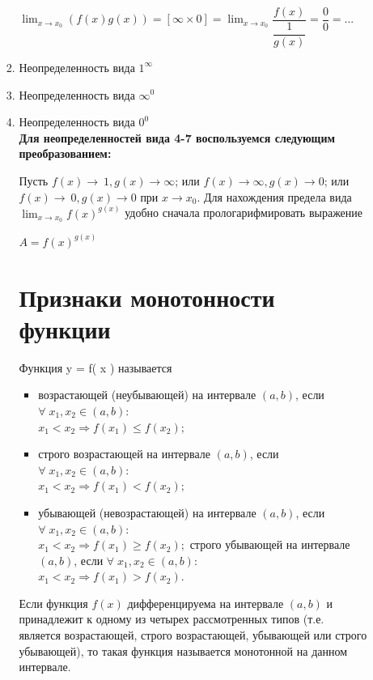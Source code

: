 \documentclass[oneside]{book}
\begin{document}
\begin{enumerate}
\begin{itemize}
\begin{enumerate}
	$\lim_{x \to x_{0}} (f(x)g(x))=
	[\infty\times 0]=
	\lim_{x \to x_{0}} \dfrac{f(x)}{\dfrac{1}{g(x)}}=
	\dfrac{0}{0}=...$

	\item Неопределенность вида $1^{\infty}$
	\item Неопределенность вида $\infty^{0}$
	\item Неопределенность вида $0^{0}$\\

	\textbf{Для неопределенностей вида 4-7 воспользуемся следующим преобразованием:}

	Пусть $f(x)\to\ 1, g(x)\to\infty$; или $f(x)\to\infty, g(x)\to 0$; или $f(x)\to\ 0, g(x)\to 0$ при $x\to x_{0}$. Для нахождения предела вида $\lim_{x\to x_{0}} f(x)^{g(x)}$ удобно сначала прологарифмировать выражение
	 \begin{center}
		$A=f(x)^{g(x)}$
	\end{center}

  \setcounter{chapter}{25}         

\setcounter{chapter}{26}         
\chapter{Признаки монотонности функции\\}         

Функция y = f\left( x \right) называется \\ 
\begin{itemize}
    \item возрастающей (неубывающей) на интервале $\left( {a,b} \right)$, если
    ${\forall\;{x_1},{x_2} \in \left( {a,b} \right):\;}$\\
    ${{x_1} < {x_2} \Rightarrow f\left( {{x_1}} \right) \leq f\left( {{x_2}} \right);}$
    \item строго возрастающей на интервале $\left( {a,b} \right)$, если
    ${\forall\;{x_1},{x_2} \in \left( {a,b} \right):\;}$\\
    ${{x_1} < {x_2} \Rightarrow f\left( {{x_1}} \right) \lt f\left( {{x_2}} \right);}$
    \item убывающей (невозрастающей) на интервале $\left( {a,b} \right)$, если
    ${\forall\;{x_1},{x_2} \in \left( {a,b} \right):\;}$\\
    ${{x_1} < {x_2} \Rightarrow f\left( {{x_1}} \right) \ge f\left( {{x_2}} \right);}$
    строго убывающей на интервале $\left( {a,b} \right)$, если
    ${\forall\;{x_1},{x_2} \in \left( {a,b} \right):\;}$\\
    ${{x_1} < {x_2} \Rightarrow f\left( {{x_1}} \right) \gt f\left( {{x_2}} \right).}$
\end{itemize}
Если функция $f\left( x \right)$ дифференцируема на интервале $\left( {a,b} \right)$ и принадлежит к одному из четырех рассмотренных типов
(т.е. является возрастающей, строго возрастающей, убывающей или строго убывающей), то такая функция называется монотонной на данном интервале. 
\setcounter{chapter}{27}         

\end{enumerate}
\end{itemize}
\end{enumerate}
\end{document}
